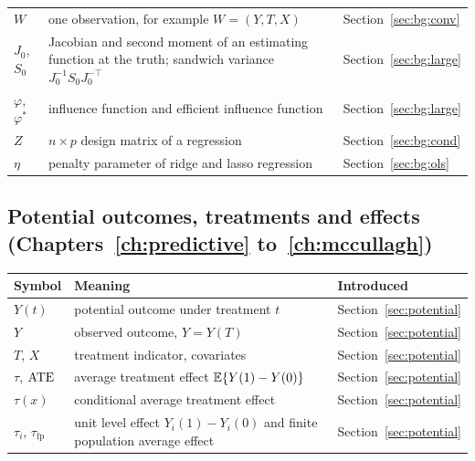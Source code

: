 {\noindent\small\centering
\setlength{\tabcolsep}{4pt}\renewcommand{\arraystretch}{1.1}
\begin{tabular}{>{\raggedright\arraybackslash}p{1.0in}>{\raggedright\arraybackslash}p{2.15in}>{\raggedright\arraybackslash}p{0.95in}}
$W$ & one observation, for example $W = (Y, T, X)$ & Section~\ref{sec:bg:conv} \\
$J_0$, $S_0$ & Jacobian and second moment of an estimating function at the truth; sandwich variance $J_0^{-1}S_0J_0^{-\top}$ & Section~\ref{sec:bg:large} \\
$\varphi$, $\varphi^*$ & influence function and efficient influence function & Section~\ref{sec:bg:large} \\
$Z$ & $n \times p$ design matrix of a regression & Section~\ref{sec:bg:cond} \\
$\eta$ & penalty parameter of ridge and lasso regression & Section~\ref{sec:bg:ols} \\
\bottomrule
\end{tabular}\par}

\subsection*{Potential outcomes, treatments and effects (Chapters~\ref{ch:predictive} to~\ref{ch:mccullagh})}

{\noindent\small\centering
\setlength{\tabcolsep}{4pt}\renewcommand{\arraystretch}{1.1}
\begin{tabular}{>{\raggedright\arraybackslash}p{1.0in}>{\raggedright\arraybackslash}p{2.15in}>{\raggedright\arraybackslash}p{0.95in}}
\toprule
Symbol & Meaning & Introduced \\
\midrule
$Y(t)$ & potential outcome under treatment $t$ & Section~\ref{sec:potential} \\
$Y$ & observed outcome, $Y = Y(T)$ & Section~\ref{sec:potential} \\
$T$, $X$ & treatment indicator, covariates & Section~\ref{sec:potential} \\
$\tau$, $\mathrm{ATE}$ & average treatment effect $\mathbb{E}\{Y(1) - Y(0)\}$ & Section~\ref{sec:potential} \\
$\tau(x)$ & conditional average treatment effect & Section~\ref{sec:potential} \\
$\tau_i$, $\tau_{\mathrm{fp}}$ & unit level effect $Y_i(1) - Y_i(0)$ and finite population average effect & Section~\ref{sec:potential} \\
\end{tabular}\par}

